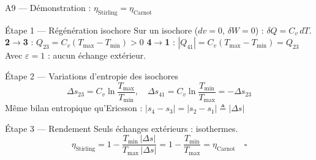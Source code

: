 \documentclass[aspectratio=43, 10pt]{beamer}
\newcommand{\Tmin}{T_{\min}}
\newcommand{\Tmax}{T_{\max}}
\newcommand{\etaC}{\eta_{\text{Carnot}}}
\begin{document}
\begin{frame}{A9 --- D\'emonstration : $\eta_{\text{Stirling}} = \etaC$}

  \begin{block}{\'Etape 1 --- R\'eg\'en\'eration isochore}
    \small
    Sur un isochore ($dv = 0$, $\delta W = 0$) : $\delta Q = C_v\,dT$.
    \textbf{2$\to$3} : $Q_{23} = C_v(\Tmax-\Tmin) > 0$\quad
    \textbf{4$\to$1} : $|Q_{41}| = C_v(\Tmax-\Tmin) = Q_{23}$
    Avec $\varepsilon = 1$ : aucun \'echange ext\'erieur.
  \end{block}

  \begin{block}{\'Etape 2 --- Variations d'entropie des isochores}
    \[
      \Delta s_{23} = C_v\ln\!\frac{\Tmax}{\Tmin}, \quad
      \Delta s_{41} = C_v\ln\!\frac{\Tmin}{\Tmax} = -\Delta s_{23}
    \]
    M\^eme bilan entropique qu'Ericsson :
    $|s_4-s_3| = |s_2-s_1| \triangleq |\Delta s|$
  \end{block}

  \begin{block}{\'Etape 3 --- Rendement}
    Seuls \'echanges ext\'erieurs : isothermes.
    \[
      \boxed{\eta_{\text{Stirling}}
             = 1 - \frac{\Tmin\,|\Delta s|}{\Tmax\,|\Delta s|}
             = 1 - \frac{\Tmin}{\Tmax}
             = \etaC}
      \quad\square
    \]
  \end{block}

\end{frame}
\end{document}
